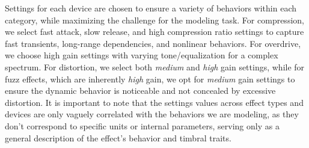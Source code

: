 Settings for each device are chosen to ensure a variety of behaviors within each category, while maximizing the challenge for the modeling task.
For compression, we select fast attack, slow release, and high compression ratio settings to capture fast transients, long-range dependencies, and nonlinear behaviors. 
For overdrive, we choose high gain settings with varying tone/equalization for a complex spectrum.
For distortion, we select both \textit{medium} and \textit{high} gain settings, while for fuzz effects, which are inherently \textit{high} gain, we opt for \textit{medium} gain settings to ensure the dynamic behavior is noticeable and not concealed by excessive distortion.
It is important to note that the settings values across effect types and devices are only vaguely correlated with the behaviors we are modeling, as they don't correspond to specific units or internal parameters, serving only as a general description of the effect's behavior and timbral traits.

